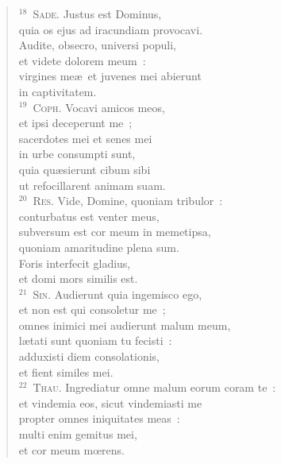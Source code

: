 \begin{flushleft}
\begin{verse}
${}^{18}$~\textsc{Sade.} Justus est Dominus,\\ quia os ejus ad iracundiam provocavi.\\ Audite, obsecro, universi populi,\\ et videte dolorem meum~:\\ virgines me\ae\ et juvenes mei abierunt\\ in captivitatem.\\
${}^{19}$~\textsc{Coph.} Vocavi amicos meos,\\ et ipsi deceperunt me~;\\ sacerdotes mei et senes mei\\ in urbe consumpti sunt,\\ quia qu\ae sierunt cibum sibi\\ ut refocillarent animam suam.\\
${}^{20}$~\textsc{Res.} Vide, Domine, quoniam tribulor~:\\ conturbatus est venter meus,\\ subversum est cor meum in memetipsa,\\ quoniam amaritudine plena sum.\\ Foris interfecit gladius,\\ et domi mors similis est.\\
${}^{21}$~\textsc{Sin.} Audierunt quia ingemisco ego,\\ et non est qui consoletur me~;\\ omnes inimici mei audierunt malum meum,\\ l\ae tati sunt quoniam tu fecisti~:\\ adduxisti diem consolationis,\\ et fient similes mei.\\
${}^{22}$~\textsc{Thau.} Ingrediatur omne malum eorum coram te~:\\ et vindemia eos, sicut vindemiasti me\\ propter omnes iniquitates meas~:\\ multi enim gemitus mei,\\ et cor meum mœrens.\end{verse}\end{flushleft}


